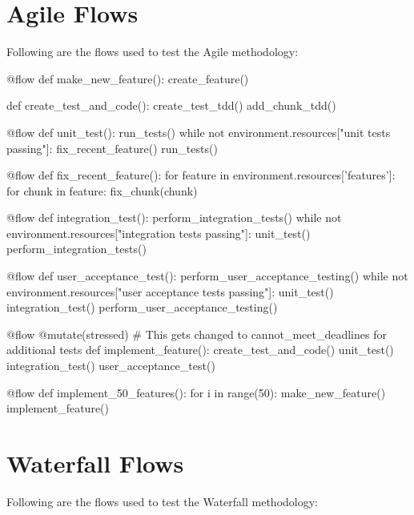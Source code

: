 \begin{appendices}
\appendix

\chapter{Agile Flows}
\label{appendix:agile_flows}
Following are the flows used to test the Agile methodology: \par

\begin{pyglist}[language = python, caption={Flows used to test the Agile methodology}, listingname=\textbf{Code Listing} \comment{, fvset={frame=single,framerule=1pt}}, numbers=left]
@flow
def make_new_feature():
    create_feature()


def create_test_and_code():
    create_test_tdd()
    add_chunk_tdd()


@flow
def unit_test():
    run_tests()
    while not environment.resources["unit tests passing"]:
        fix_recent_feature()
        run_tests()


@flow
def fix_recent_feature():
    for feature in environment.resources['features']:
        for chunk in feature:
            fix_chunk(chunk)


@flow
def integration_test():
    perform_integration_tests()
    while not environment.resources["integration tests passing"]:
        unit_test()
        perform_integration_tests()


@flow
def user_acceptance_test():
    perform_user_acceptance_testing()
    while not environment.resources["user acceptance tests passing"]:
        unit_test()
        integration_test()
        perform_user_acceptance_testing()


@flow
@mutate(stressed)  # This gets changed to cannot_meet_deadlines for additional tests
def implement_feature():
    create_test_and_code()
    unit_test()
    integration_test()
    user_acceptance_test()


@flow
def implement_50_features():
    for i in range(50):
        make_new_feature()
        implement_feature()
\end{pyglist}

\chapter{Waterfall Flows}
\label{appendix:waterfall_flows}
Following are the flows used to test the Waterfall methodology: \par


\end{appendices}
